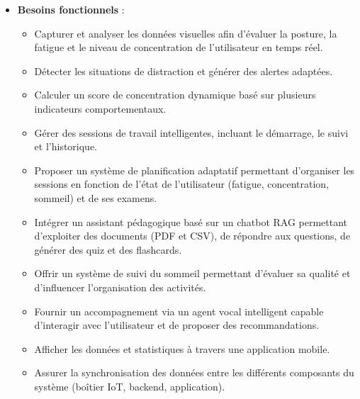 \documentclass[12pt,a4paper]{report}
\begin{document}
\vspace{0.5em}
\begin{itemize}
    \item \textbf{Besoins fonctionnels} :
    \begin{itemize}
        \item Capturer et analyser les données visuelles afin d'évaluer la posture, la fatigue et le niveau de concentration de l'utilisateur en temps réel.
        \item Détecter les situations de distraction et générer des alertes adaptées.
        \item Calculer un score de concentration dynamique basé sur plusieurs indicateurs comportementaux.
        \item Gérer des sessions de travail intelligentes, incluant le démarrage, le suivi et l'historique.
        \item Proposer un système de planification adaptatif permettant d'organiser les sessions en fonction de l'état de l'utilisateur (fatigue, concentration, sommeil) et de ses examens.
        \item Intégrer un assistant pédagogique basé sur un chatbot \ac{RAG} permettant d'exploiter des documents (PDF et CSV), de répondre aux questions, de générer des quiz et des flashcards.
        \item Offrir un système de suivi du sommeil permettant d'évaluer sa qualité et d'influencer l'organisation des activités.
        \item Fournir un accompagnement via un agent vocal intelligent capable d'interagir avec l'utilisateur et de proposer des recommandations.
        \item Afficher les données et statistiques à travers une application mobile.
        \item Assurer la synchronisation des données entre les différents composants du système (boîtier \ac{IoT}, backend, application).
    \end{itemize}


\end{itemize}
\end{document}
